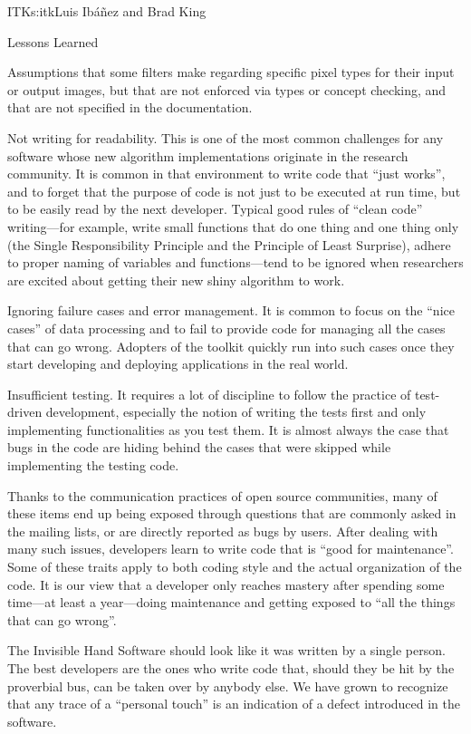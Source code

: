 \begin{aosachapter}{ITK}{s:itk}{Luis Ib\'{a}\~{n}ez and Brad King}
\begin{aosasect1}{Lessons Learned}
\begin{aosaitemize}
\item Assumptions that some filters make regarding specific pixel types for
their input or output images, but that are not enforced via types or concept
checking, and that are not specified in the documentation.
\item Not writing for readability. This is one of the most common
challenges for any software whose new algorithm implementations originate in
the research community. It is common in that environment to write code that
``just works'', and to forget that the purpose of code is not just to be
executed at run time, but to be easily read by the next
developer. Typical good rules of ``clean code'' writing---for example, write 
small functions that do one thing and one thing only (the Single Responsibility 
Principle and the Principle of Least Surprise), adhere to proper naming of variables 
and functions---tend to be ignored when
researchers are excited about getting their new shiny algorithm to work. 

\item Ignoring failure cases and error management. It is common to
focus on the ``nice cases'' of data processing and to fail to provide code for
managing all the cases that can go wrong. Adopters of the toolkit
quickly run into such cases once they start developing and deploying
applications in the real world.
\item Insufficient testing. It requires a lot of discipline to follow the
practice of test-driven development, especially the notion of writing the tests
first and only implementing functionalities as you test them. It is almost always
the case that bugs in the code are hiding behind the cases that were skipped
while implementing the testing code.
\end{aosaitemize}

Thanks to the communication practices of open source communities, many of these
items end up being exposed through questions that are commonly asked in the
mailing lists, or are directly reported as bugs by users.
After dealing with many such issues, developers learn to write code
that is ``good for maintenance''. Some of these traits apply to both coding
style and the actual organization of the code. It is our view that a developer
only reaches mastery after spending some time---at least a year---doing maintenance
and getting exposed to ``all the things that can go wrong''.

\begin{aosasect2}{The Invisible Hand}
Software should look like it was written by a single person. The best developers
are the ones who write code that, should they be hit by the proverbial bus, can 
be taken over by anybody else. We have
grown to recognize that any trace of a ``personal touch'' is an indication of a
defect introduced in the software.


\end{aosasect2}
\end{aosasect1}
\end{aosachapter}
